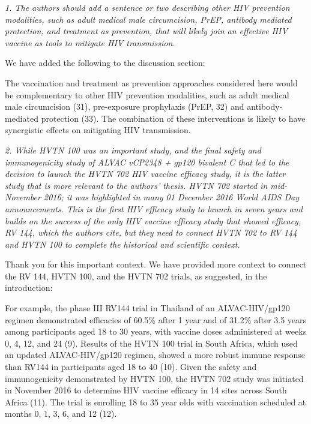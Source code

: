 \documentclass[12pt]{jpmletter}
\newenvironment{original}{\it}{}
\begin{document}
\begin{letter}{}
\begin{original}
      1. The authors should add a sentence or two describing other HIV
      prevention modalities, such as adult medical male circumcision,
      PrEP, antibody mediated protection, and treatment as prevention,
      that will likely join an effective HIV vaccine as tools to
      mitigate HIV transmission.
    \end{original}

    We have added the following to the discussion section:
    \begin{quoting}
      The vaccination and treatment as prevention approaches
      considered here would be complementary to other HIV prevention
      modalities, such as adult medical male circumcision (31),
      pre-exposure prophylaxis (PrEP, 32) and antibody-mediated
      protection (33). The combination of these interventions is
      likely to have synergistic effects on mitigating HIV
      transmission.
    \end{quoting}

    \begin{original}
      2. While HVTN 100 was an important study, and the final safety
      and immunogenicity study of ALVAC vCP2348 + gp120 bivalent C
      that led to the decision to launch the HVTN 702 HIV vaccine
      efficacy study, it is the latter study that is more relevant to
      the authors' thesis. HVTN 702 started in mid-November 2016; it
      was highlighted in many 01 December 2016 World AIDS Day
      announcements. This is the first HIV efficacy study to launch in
      seven years and builds on the success of the only HIV vaccine
      efficacy study that showed efficacy, RV 144, which the authors
      cite, but they need to connect HVTN 702 to RV 144 and HVTN 100
      to complete the historical and scientific context.
    \end{original}

    Thank you for this important context.  We have provided more
    context to connect the RV 144, HVTN 100, and the HVTN 702 trials,
    as suggested, in the introduction:
    \begin{quoting}
      For example, the phase III RV144 trial in Thailand of an
      ALVAC-HIV/gp120 regimen demonstrated efficacies of 60.5\% after
      1 year and of 31.2\% after 3.5 years among participants aged 18
      to 30 years, with vaccine doses administered at weeks 0, 4, 12,
      and 24 (9). Results of the HVTN 100 trial in South Africa,
      which used an updated ALVAC-HIV/gp120 regimen, showed a more
      robust immune response than RV144 in participants aged 18 to 40
      (10).  Given the safety and immunogenicity demonstrated by HVTN
      100, the HVTN 702 study was initiated in November 2016 to
      determine HIV vaccine efficacy in 14 sites across South Africa
      (11). The trial is enrolling 18 to 35 year olds with vaccination
      scheduled at months 0, 1, 3, 6, and 12 (12).
    \end{quoting}


\end{letter}
\end{document}

